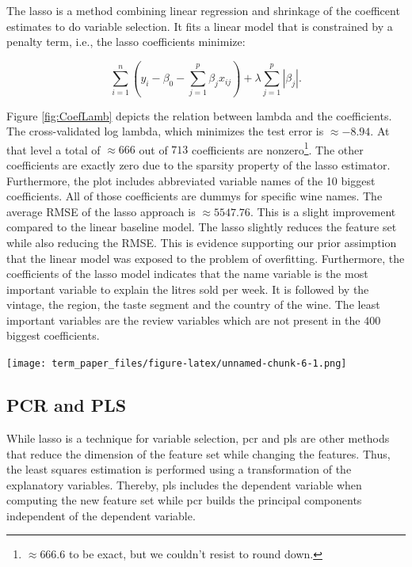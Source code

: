 \documentclass[11pt,]{article}
\let\origfigure\figure
\let\endorigfigure\endfigure
\renewenvironment{figure}[1][2] {
    \expandafter\origfigure\expandafter[H]
} {
    \endorigfigure
}
\let\rmarkdownfootnote\footnote%
\def\footnote{\protect\rmarkdownfootnote}
\begin{document}
The \ac{lasso} is a method combining linear regression and shrinkage of
the coefficent estimates to do variable selection. It fits a linear
model that is constrained by a penalty term, i.e., the \ac{lasso}
coefficients minimize:

\[
\sum_{i=1}^{n}(y_i - \beta_0 - \sum_{j=1}^{p}\beta_jx_{ij})+\lambda\sum_{j=1}^{p}|\beta_j|.
\]

Figure \ref{fig:CoefLamb} depicts the relation between lambda and the
coefficients. The cross-validated log lambda, which minimizes the test
error is \(\approx -8.94\). At that level a total of \(\approx 666\) out
of \(713\) coefficients are
nonzero\footnote{$\approx 666.6$ to be exact, but we couldn't resist to round down.}.
The other coefficients are exactly zero due to the sparsity property of
the \ac{lasso} estimator. Furthermore, the plot includes abbreviated
variable names of the 10 biggest coefficients. All of those coefficients
are dummys for specific wine names. The average \ac{RMSE} of the
\ac{lasso} approach is \(\approx 5547.76\). This is a slight improvement
compared to the linear baseline model. The \ac{lasso} slightly reduces
the feature set while also reducing the \ac{RMSE}. This is evidence
supporting our prior assimption that the linear model was exposed to the
problem of overfitting. Furthermore, the coefficients of the \ac{lasso}
model indicates that the name variable is the most important variable to
explain the litres sold per week. It is followed by the vintage, the
region, the taste segment and the country of the wine. The least
important variables are the review variables which are not present in
the \(400\) biggest coefficients.

\begin{figure}
\centering
\texttt{[image: term\_paper\_files/figure-latex/unnamed-chunk-6-1.png]}
\caption{\label{fig:CoefLamb}Relation of Coefficients and Shrinkage.}
\end{figure}

\hypertarget{pcr-and-pls}{%
\subsection{PCR and PLS}\label{pcr-and-pls}}

While \ac{lasso} is a technique for variable selection, \ac{pcr} and
\ac{pls} are other methods that reduce the dimension of the feature set
while changing the features. Thus, the least squares estimation is
performed using a transformation of the explanatory variables. Thereby,
\ac{pls} includes the dependent variable when computing the new feature
set while \ac{pcr} builds the principal components independent of the
dependent variable.
\end{document}
